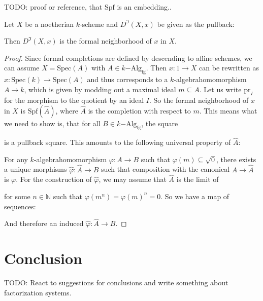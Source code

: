 \documentclass[9pt,twosided]{amsart}
\newcommand{\bN}{\mathbb N}
\newcommand{\Spec}{\ensuremath{\mathrm{Spec}}}
\newcommand{\Spf}{\ensuremath{\mathrm{Spf}}}
\newcommand{\fgkAlg}{\ensuremath{k\mathrm{-Alg}_{\mathrm{fg}}}}
\newcommand{\fgkAlgTop}{\ensuremath{k\mathrm{-Alg}_{\mathrm{fg,top}}}}
\newcommand{\todo}[1]{{\color{red}TODO: #1 \\}}
\begin{document}
\todo{proof or reference, that $\Spf$ is an embedding..}
\begin{rmk}
  Let $X$ be a noetherian $k$-scheme and $D^\Im(X,x)$ be given as the pullback:
  \begin{center}
  \end{center}
  Then $D^\Im(X,x)$ is the formal neighborhood of $x$ in $X$. 
\end{rmk}
\begin{proof}
  Since formal completions are defined by descending to affine schemes, we can assume $X=\Spec(A)$ with $A\in\fgkAlg$.
  Then $x:1\to X$ can be rewritten as $x:\Spec(k)\to\Spec(A)$ and thus corresponds to a $k$-algebrahomomorphism $A\to k$,
  which is given by modding out a maximal ideal $m\subseteq A$. Let us write $\mathrm{pr}_I$ for the morphism to the quotient by an ideal $I$.
  So the formal neighborhood of $x$ in $X$ is $\Spf(\hat{A})$, where $\hat{A}$ is the completion with respect to $m$.
  This means what we need to show is, that for all $B\in\fgkAlg$, the square
  \begin{center}
  \end{center}
  is a pullback square. This amounts to the following universal property of $\hat{A}$:

  For any $k$-algebrahomomorphism $\varphi:A\to B$ such that $\varphi(m)\subseteq \sqrt{0}$, there exists a unique morphisms
  $\hat{\varphi}:\hat{A}\to B$ such that composition with the canonical $A\to\hat{A}$ is $\varphi$.
  For the construction of $\hat{\varphi}$, we may assume that $\hat{A}$ is the limit of
  \begin{center}
  \end{center}
  for some $n\in\bN$ such that $\varphi(m^n)=\varphi(m)^n={0}$. So we have a map of sequences:
  \begin{center}
  \end{center}
  And therefore an induced $\hat{\varphi}:\hat{A}\to B$.
\end{proof}

\section{Conclusion}
\todo{React to suggestions for conclusions and write something about factorization systems.}

\printbibliography
\end{document}
